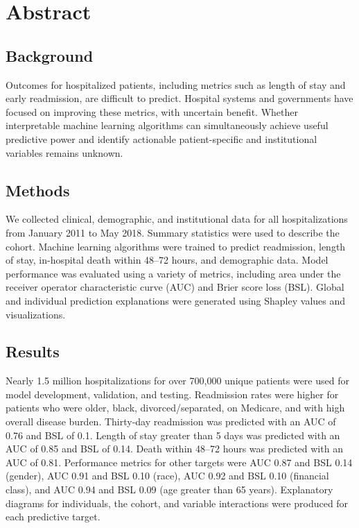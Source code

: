 \section{Abstract}
\subsection{Background}%
Outcomes for hospitalized patients, including metrics such as length of stay
and early readmission, are difficult to predict.\@
Hospital systems and governments have focused on improving these metrics,
with uncertain benefit.\@
Whether interpretable machine learning algorithms can simultaneously
achieve useful predictive power and identify actionable 
patient-specific and institutional variables remains unknown.\@
\subsection{Methods}%
We collected clinical, demographic, and institutional data for all hospitalizations
from January 2011 to May 2018.\@
Summary statistics were used to describe the cohort.\@
Machine learning algorithms were trained to predict 
readmission, length of stay, in-hospital death within 48--72 hours, and demographic data.\@
Model performance was evaluated using a variety of metrics, including 
area under the receiver operator characteristic curve (AUC) and Brier score loss (BSL).\@
Global and individual prediction explanations 
were generated using Shapley values and visualizations.\@
\subsection{Results}%
Nearly 1.5 million hospitalizations for over 700,000 unique patients were used
for model development, validation, and testing. 
Readmission rates were higher for patients who were 
older, black, divorced/separated, on Medicare, 
and with high overall disease burden.\@
Thirty-day readmission was predicted with an AUC of 0.76 and BSL of 0.1.\@
Length of stay greater than 5 days was predicted with an AUC of 0.85 and BSL of 0.14.\@
Death within 48--72 hours was predicted with an AUC of 0.81.\@ 
Performance metrics for other targets were AUC 0.87 and BSL 0.14 (gender), AUC 0.91 and BSL 0.10 (race), 
AUC 0.92 and BSL 0.10 (financial class), and AUC 0.94 and BSL 0.09 (age greater than 65 years).\@
Explanatory diagrams for individuals, the cohort, and variable interactions were produced for each predictive target.\@ 
